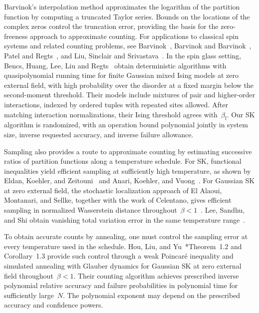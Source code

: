 \documentclass[letterpaper,11pt,reqno]{amsart}
\begin{document}
Barvinok's interpolation method approximates the logarithm of the partition function by computing a truncated Taylor series. Bounds on the locations of the complex zeros control the truncation error, providing the basis for the zero-freeness approach to approximate counting. For applications to classical spin systems and related counting problems, see Barvinok~\cite{Bar17}, Barvinok and Barvinok~\cite{BB21}, Patel and Regts~\cite{PR17}, and Liu, Sinclair and Srivastava~\cite{LSS19}. In the spin glass setting, Bencs, Huang, Lee, Liu and Regts~\cite{BHL25} obtain deterministic algorithms with quasipolynomial running time for finite Gaussian mixed Ising models at zero external field, with high probability over the disorder at a fixed margin below the second-moment threshold. Their models include mixtures of pair and higher-order interactions, indexed by ordered tuples with repeated sites allowed. After matching interaction normalizations, their Ising threshold agrees with~$\beta_{\mathrm f}$. Our SK algorithm is randomized, with an operation bound polynomial jointly in system size, inverse requested accuracy, and inverse failure allowance.

Sampling also provides a route to approximate counting by estimating successive ratios of partition functions along a temperature schedule. For SK, functional inequalities yield efficient sampling at sufficiently high temperature, as shown by Eldan, Koehler, and Zeitouni~\cite{EKZ22} and Anari, Koehler, and Vuong~\cite{AKV24}. For Gaussian SK at zero external field, the stochastic localization approach of El Alaoui, Montanari, and Sellke, together with the work of Celentano, gives efficient sampling in normalized Wasserstein distance throughout~$\beta<1$~\cites{AMS25,Cel24}. Lee, Sandhu, and Shi obtain vanishing total variation error in the same temperature range~\cite{LSS26}.

To obtain accurate counts by annealing, one must control the sampling error at every temperature used in the schedule. Hou, Liu, and Yu~\cite{HLY26}*{Theorem~1.2 and Corollary~1.3} provide such control through a weak Poincar\'e inequality and simulated annealing with Glauber dynamics for Gaussian SK at zero external field throughout~$\beta<1$. Their counting algorithm achieves prescribed inverse polynomial relative accuracy and failure probabilities in polynomial time for sufficiently large~$N$. The polynomial exponent may depend on the prescribed accuracy and confidence powers.
\end{document}
